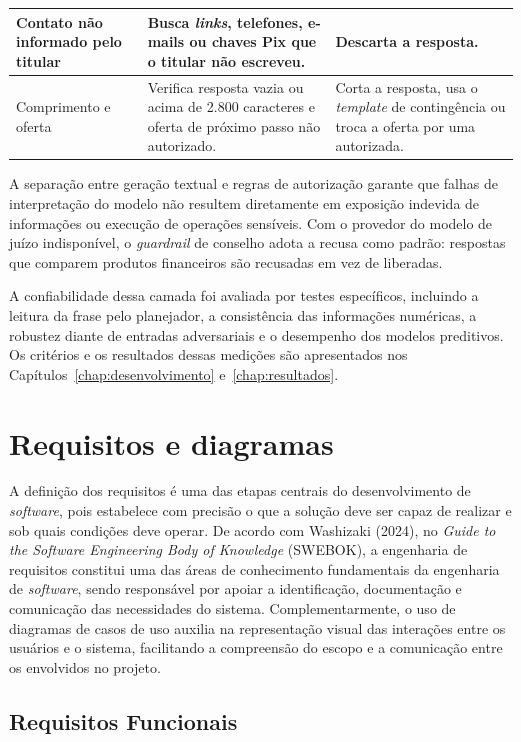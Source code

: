 {\begin{longtable}{|L{3.7cm}|L{5.2cm}|L{5.4cm}|}
Contato não informado pelo titular &
Busca \textit{links}, telefones, e-mails ou chaves Pix que o titular não escreveu. &
Descarta a resposta.
\\ \hline

Comprimento e oferta &
Verifica resposta vazia ou acima de 2.800 caracteres e oferta de próximo passo não autorizado. &
Corta a resposta, usa o \textit{template} de contingência ou troca a oferta por uma autorizada.
\\ \hline

\end{longtable}
}

A separação entre geração textual e regras de autorização garante que falhas de interpretação do modelo não resultem diretamente em exposição indevida de informações ou execução de operações sensíveis. Com o provedor do modelo de juízo indisponível, o \textit{guardrail} de conselho adota a recusa como padrão: respostas que comparem produtos financeiros são recusadas em vez de liberadas.

A confiabilidade dessa camada foi avaliada por testes específicos, incluindo a leitura da frase pelo planejador, a consistência das informações numéricas, a robustez diante de entradas adversariais e o desempenho dos modelos preditivos. Os critérios e os resultados dessas medições são apresentados nos Capítulos~\ref{chap:desenvolvimento} e~\ref{chap:resultados}.

\section{Requisitos e diagramas}

A definição dos requisitos é uma das etapas centrais do desenvolvimento de \textit{software}, pois estabelece com precisão o que a solução deve ser capaz de realizar e sob quais condições deve operar. De acordo com Washizaki (2024), no \textit{Guide to the Software Engineering Body of Knowledge} (SWEBOK), a engenharia de requisitos constitui uma das áreas de conhecimento fundamentais da engenharia de \textit{software}, sendo responsável por apoiar a identificação, documentação e comunicação das necessidades do sistema. Complementarmente, o uso de diagramas de casos de uso auxilia na representação visual das interações entre os usuários e o sistema, facilitando a compreensão do escopo e a comunicação entre os envolvidos no projeto.

\subsection{Requisitos Funcionais}

